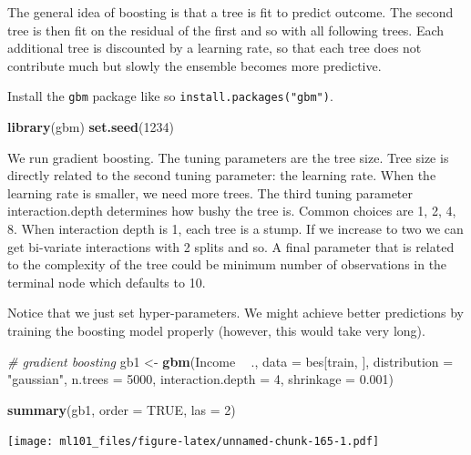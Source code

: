 \documentclass[]{article}
\newenvironment{Shaded}{\begin{snugshade}}{\end{snugshade}}
\newcommand{\CommentTok}[1]{\textcolor[rgb]{0.56,0.35,0.01}{\textit{#1}}}
\newcommand{\DataTypeTok}[1]{\textcolor[rgb]{0.13,0.29,0.53}{#1}}
\newcommand{\DecValTok}[1]{\textcolor[rgb]{0.00,0.00,0.81}{#1}}
\newcommand{\FloatTok}[1]{\textcolor[rgb]{0.00,0.00,0.81}{#1}}
\newcommand{\KeywordTok}[1]{\textcolor[rgb]{0.13,0.29,0.53}{\textbf{#1}}}
\newcommand{\NormalTok}[1]{#1}
\newcommand{\OperatorTok}[1]{\textcolor[rgb]{0.81,0.36,0.00}{\textbf{#1}}}
\newcommand{\OtherTok}[1]{\textcolor[rgb]{0.56,0.35,0.01}{#1}}
\newcommand{\StringTok}[1]{\textcolor[rgb]{0.31,0.60,0.02}{#1}}
\begin{document}
The general idea of boosting is that a tree is fit to predict outcome. The second tree is then fit on the residual of the first and so with all following trees. Each additional tree is discounted by a learning rate, so that each tree does not contribute much but slowly the ensemble becomes more predictive.

Install the \texttt{gbm} package like so \texttt{install.packages("gbm")}.

\begin{Shaded}
\begin{Highlighting}[]
\KeywordTok{library}\NormalTok{(gbm)}
\KeywordTok{set.seed}\NormalTok{(}\DecValTok{1234}\NormalTok{)}
\end{Highlighting}
\end{Shaded}

We run gradient boosting. The tuning parameters are the tree size. Tree size is directly related to the second tuning parameter: the learning rate. When the learning rate is smaller, we need more trees. The third tuning parameter interaction.depth determines how bushy the tree is. Common choices are 1, 2, 4, 8. When interaction depth is 1, each tree is a stump. If we increase to two we can get bi-variate interactions with 2 splits and so. A final parameter that is related to the complexity of the tree could be minimum number of observations in the terminal node which defaults to 10.

Notice that we just set hyper-parameters. We might achieve better predictions by training the boosting model properly (however, this would take very long).

\begin{Shaded}
\begin{Highlighting}[]
\CommentTok{# gradient boosting}
\NormalTok{gb1 <-}\StringTok{ }\KeywordTok{gbm}\NormalTok{(Income }\OperatorTok{~}\StringTok{ }\NormalTok{., }\DataTypeTok{data =}\NormalTok{ bes[train, ], }
           \DataTypeTok{distribution =} \StringTok{"gaussian"}\NormalTok{, }
           \DataTypeTok{n.trees =} \DecValTok{5000}\NormalTok{, }
           \DataTypeTok{interaction.depth =} \DecValTok{4}\NormalTok{,}
           \DataTypeTok{shrinkage =} \FloatTok{0.001}\NormalTok{)}

\KeywordTok{summary}\NormalTok{(gb1, }\DataTypeTok{order =} \OtherTok{TRUE}\NormalTok{, }\DataTypeTok{las =} \DecValTok{2}\NormalTok{)}
\end{Highlighting}
\end{Shaded}

\texttt{[image: ml101\_files/figure-latex/unnamed-chunk-165-1.pdf]}
\end{document}
